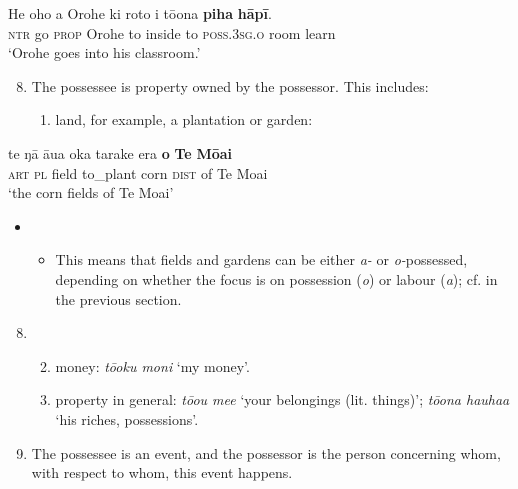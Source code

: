 \ea\label{ex:6.90}
\gll He oho a {\ꞌ}Orohe ki roto i tō{\ꞌ}ona \textbf{piha} \textbf{hāpī}. \\
\textsc{ntr} go \textsc{prop} Orohe to inside to \textsc{poss.3sg.o} room learn \\

\glt
‘Orohe goes into his classroom.’ \textstyleExampleref{[R334.027]} 
\z

\begin{enumerate}
\setcounter{enumi}{7}
\item 
The possessee is property owned by the possessor. This includes:

\begin{enumerate}
\item 
land, for example, a plantation or garden:

\end{enumerate}
\end{enumerate}

\ea\label{ex:6.91}
\gll te ŋā {\ꞌ}āua {\ꞌ}oka tarake era \textbf{o} \textbf{Te} \textbf{Mōai} \\
\textsc{art} \textsc{pl} field to\_plant corn \textsc{dist} of Te Moai \\

\glt
‘the corn fields of Te Moai’ \textstyleExampleref{[R539-2.154]}
\z

\begin{itemize}
\item[]
\begin{itemize}
\item[]
This means that fields and gardens can be either \textit{a-} or \textit{o-}possessed, depending on whether the focus is on possession (\textit{o}) or labour (\textit{{\ꞌ}a}); cf.  in the previous section. 
\end{itemize}
\end{itemize}

\begin{enumerate}
\setcounter{enumi}{7}
\item[]
\begin{enumerate}
\setcounter{enumii}{1}
\item 
money: \textit{tō{\ꞌ}oku moni} ‘my money’.

\item 
property in general: \textit{tō{\ꞌ}ou me{\ꞌ}e} ‘your belongings (lit. things)’; \textit{tō{\ꞌ}ona hauha{\ꞌ}a} ‘his riches, possessions’.

\end{enumerate}
\setcounter{enumi}{8}
\item 
The possessee is an event, and the possessor is the person concerning whom, with respect to whom, this event happens.

\end{enumerate}

